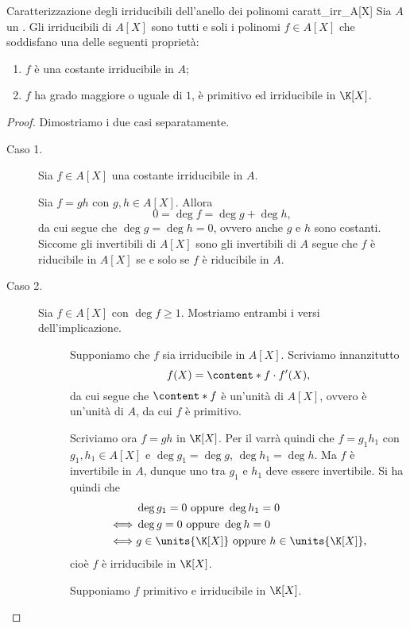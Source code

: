 \begin{theorem}{Caratterizzazione degli irriducibili dell'anello dei polinomi}
    {caratt_irr_A[X]}
    Sia $A$ un \UFD. Gli irriducibili di $A[X]$ sono tutti e soli i polinomi $f \in A[X]$ che soddisfano una delle seguenti proprietà:
    \begin{enumerate}
        \item $f$ è una costante irriducibile in $A$;
        \item $f$ ha grado maggiore o uguale di $1$, è primitivo ed irriducibile in $\K[X]$.
    \end{enumerate}
\end{theorem}
\begin{proof}
    Dimostriamo i due casi separatamente.
    \begin{description}
        \item[Caso 1.] Sia $f \in A[X]$ una costante irriducibile in $A$. 
        
        Sia $f = gh$ con $g, h \in A[X]$. Allora \[
            0 = \deg f = \deg g + \deg h,    
        \] da cui segue che $\deg g = \deg h = 0$, ovvero anche $g$ e $h$ sono costanti. Siccome gli invertibili di $A[X]$ sono gli invertibili di $A$ segue che $f$ è riducibile in $A[X]$ se e solo se $f$ è riducibile in $A$.
        \item[Caso 2.] Sia $f \in A[X]$ con $\deg f \geq 1$. Mostriamo entrambi i versi dell'implicazione.
        \begin{description}
            \item[\boximpl ] Supponiamo che $f$ sia irriducibile in $A[X]$. Scriviamo innanzitutto \[
                f(X) = \content*{f}\cdot f'(X),    
            \] da cui segue che $\content*{f}$ è un'unità di $A[X]$, ovvero è un'unità di $A$, da cui $f$ è primitivo.

            Scriviamo ora $f = gh$ in $\K[X]$. Per il  varrà quindi che $f = g_1h_1$ con $g_1, h_1 \in A[X]$ e $\deg g_1 = \deg g$, $\deg h_1 = \deg h$. Ma $f$ è invertibile in $A$, dunque uno tra $g_1$ e $h_1$ deve essere invertibile. Si ha quindi che \begin{align}
                &\deg g_1 = 0 \text{ oppure } \deg h_1 = 0 \\
                \iff &\deg g = 0 \text{ oppure } \deg h = 0\\
                \iff &g \in \units{\K[X]} \text{ oppure } h \in \units{\K[X]},
            \end{align}
            cioè $f$  è irriducibile in $\K[X]$.
            \item[\boximplby] Supponiamo $f$ primitivo e irriducibile in $\K[X]$.
            

\end{description}
\end{description}
\end{proof}
